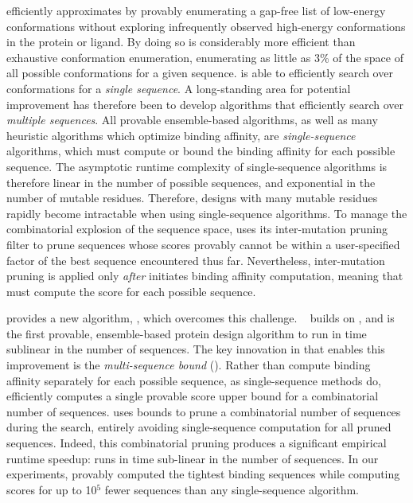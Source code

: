 \ks efficiently approximates \ka by provably enumerating a gap-free list of low-energy conformations without exploring infrequently observed high-energy conformations in the protein or ligand. By doing so \ks is considerably more efficient than exhaustive conformation enumeration, enumerating as little as 3\% of the space of all possible conformations for a given sequence. \ks is able to efficiently search over conformations for a \textit{single sequence}. A long-standing area for potential improvement has therefore been to develop algorithms that efficiently search over \textit{multiple sequences}. All provable ensemble-based algorithms, as well as many heuristic algorithms which optimize binding affinity, are \emph{single-sequence} algorithms, which must compute or bound the binding affinity for each possible sequence. The asymptotic runtime complexity of single-sequence algorithms is therefore linear in the number of possible sequences, and exponential in the number of mutable residues. Therefore, designs with many mutable residues rapidly become intractable when using single-sequence algorithms. To manage the combinatorial explosion of the sequence space, \ks uses its inter-mutation pruning filter to prune sequences whose \ks scores provably cannot be within a user-specified factor of the best sequence encountered thus far. Nevertheless, inter-mutation pruning is applied only \emph{after} \ks initiates binding affinity computation, meaning that \ks must compute the \ks score for each possible sequence.

 provides a new algorithm, \bbks, which overcomes this challenge. \bbks~\cite{BBK*} builds on \ks, and is the first provable, ensemble-based protein design algorithm to run in time sublinear in the number of sequences. The key innovation in \bbks that enables this improvement is the \emph{multi-sequence bound} (\msbound). Rather than compute binding affinity separately for each possible sequence, as single-sequence methods do, \bbks efficiently computes a single provable \ks score upper bound for a combinatorial number of sequences. \bbks uses \msbound bounds to prune a combinatorial number of sequences during the search, entirely avoiding single-sequence computation for all pruned sequences. Indeed, this combinatorial pruning produces a significant empirical runtime speedup: \bbks runs in time sub-linear in the number of sequences. In our experiments, \bbks provably computed the tightest binding sequences while computing \ks scores for up to 10$^5$ fewer sequences than any single-sequence algorithm.

